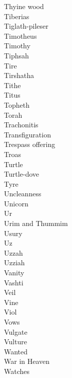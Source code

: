 Thyine wood  \\
Tiberias  \\
Tiglath-pileser  \\
Timotheus  \\
Timothy  \\
Tiphsah  \\
Tire  \\
Tirshatha  \\
Tithe  \\
Titus  \\
Topheth  \\
Torah  \\
Trachonitis  \\
Transfiguration  \\
Trespass offering  \\
Troas  \\
Turtle  \\
Turtle-dove  \\
Tyre  \\
Uncleanness  \\
Unicorn  \\
Ur  \\
Urim and Thummim  \\
Usury  \\
Uz  \\
Uzzah  \\
Uzziah  \\
Vanity  \\
Vashti  \\
Veil  \\
Vine  \\
Viol  \\
Vows  \\
Vulgate  \\
Vulture  \\
Wanted  \\
War in Heaven  \\
Watches  \\
